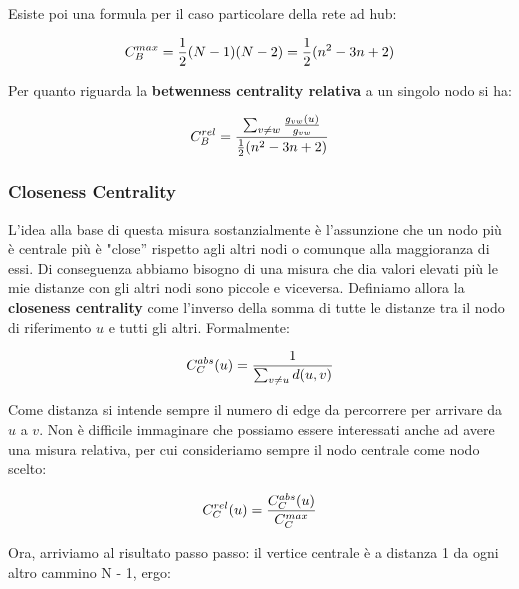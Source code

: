 \documentclass[12pt,twoside]{report}
\begin{document}
    Esiste poi una formula per il caso particolare della rete ad hub:
    
    \begin{equation}
    \large
        \displaystyle C_B^{max} = \frac{1}{2} (N-1) (N-2) = \frac{1}{2} (n^2 - 3n + 2)
    \end{equation}\vspace{0.5em}
    
    Per quanto riguarda la \textbf{betwenness centrality relativa} a un singolo nodo si ha:
    
    \begin{equation}
    \large
        \displaystyle C_B^{rel} = \frac{\sum_{v \neq w}  \frac{g_{vw}(u)}{g_{vw}}}{\frac{1}{2} (n^2 - 3n + 2)}
    \end{equation}\vspace{0.5em}

    \subsubsection{Closeness Centrality}
    
    L'idea alla base di questa misura sostanzialmente è l'assunzione che un nodo più è centrale più è "close'' rispetto agli altri nodi o comunque alla maggioranza di essi. Di conseguenza abbiamo bisogno di una misura che dia valori elevati più le mie distanze con gli altri nodi sono piccole e viceversa. Definiamo allora la \textbf{closeness centrality} come l'inverso della somma di tutte le distanze tra il nodo di riferimento $u$ e tutti gli altri. Formalmente: 
    
    
    \begin{equation}
    \large
        \displaystyle C_C^{abs}(u) = \frac{1} {\sum_{v \neq u } d(u,v)}
    \end{equation}\vspace{0.5em}
    
    Come distanza si intende sempre il numero di edge da percorrere per arrivare da $u$ a $v$. Non è difficile immaginare che possiamo essere interessati anche ad avere una misura relativa, per cui consideriamo sempre il nodo centrale come nodo scelto:
    
    \begin{equation}
    \large
        \displaystyle C_C^{rel}(u) = \frac{C_C^{abs}(u)}{C^{max}_C}
    \end{equation}\vspace{0.5em}
    
    Ora, arriviamo al risultato passo passo: il vertice centrale è a distanza 1 da ogni altro cammino N - 1, ergo: 
    
\end{document}

